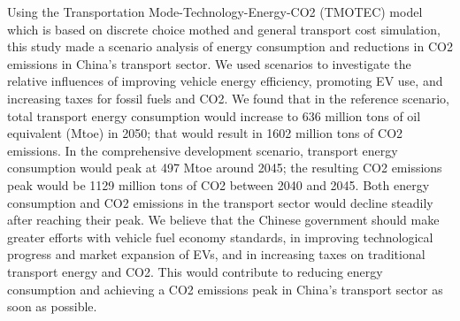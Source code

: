 Using the Transportation Mode-Technology-Energy-CO2 (TMOTEC) model which is based on discrete choice mothed and general transport cost simulation, this study made a scenario analysis of energy consumption and reductions in CO2 emissions in China’s transport sector. We used scenarios to investigate the relative influences of improving vehicle energy efficiency, promoting EV use, and increasing taxes for fossil fuels and CO2. We found that in the reference scenario, total transport energy consumption would increase to 636 million tons of oil equivalent (Mtoe) in 2050; that would result in 1602 million tons of CO2 emissions. In the comprehensive development scenario, transport energy consumption would peak at 497 Mtoe around 2045; the resulting CO2 emissions peak would be 1129 million tons of CO2 between 2040 and 2045. Both energy consumption and CO2 emissions in the transport sector would decline steadily after reaching their peak. We believe that the Chinese government should make greater efforts with vehicle fuel economy standards, in improving technological progress and market expansion of EVs, and in increasing taxes on traditional transport energy and CO2. This would contribute to reducing energy consumption and achieving a CO2 emissions peak in China’s transport sector as soon as possible.